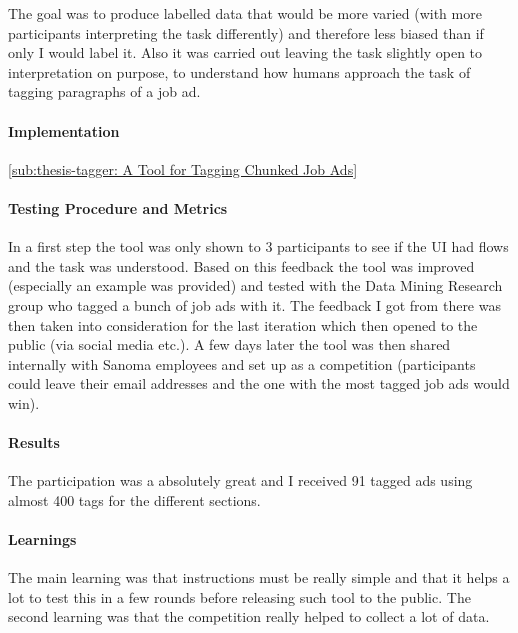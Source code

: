 The goal was to produce labelled data that would be more varied (with more participants interpreting the task differently) and therefore less biased than if only I would label it. Also it was carried out leaving the task slightly open to interpretation on purpose, to understand how humans approach the task of tagging paragraphs of a job ad.

\paragraph{Implementation}
\label{par:Implementation}

\ref{sub:thesis-tagger: A Tool for Tagging Chunked Job Ads}


\paragraph{Testing Procedure and Metrics}
\label{par:Testing Procedure and Metrics}

In a first step the tool was only shown to 3 participants to see if the UI had flows and the task was understood. Based on this feedback the tool was improved (especially an example was provided) and tested with the Data Mining Research group who tagged a bunch of job ads with it. The feedback I got from there was then taken into consideration for the last iteration which then opened to the public (via social media etc.). A few days later the tool was then shared internally with Sanoma employees and set up as a competition (participants could leave their email addresses and the one with the most tagged job ads would win).

\paragraph{Results}
\label{par:Results}

The participation was a absolutely great and I received 91 tagged ads using almost 400 tags for the different sections.

\paragraph{Learnings}
\label{par:Learnings}

The main learning was that instructions must be really simple and that it helps a lot to test this in a few rounds before releasing such tool to the public. The second learning was that the competition really helped to collect a lot of data.


